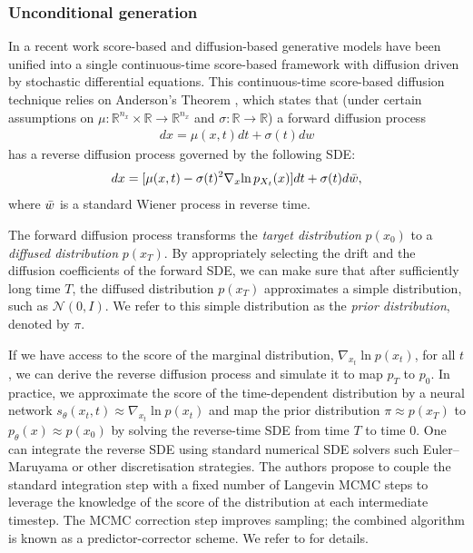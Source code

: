 \subsubsection{Unconditional generation}


In a recent work \cite{song2021sde} score-based  \cite{hyvarinen2005score_original, song2020generative_score} and diffusion-based \cite{sohldickstein2015diffusion_original, ho2020denoising} generative models have been unified into a single continuous-time score-based framework with diffusion driven by stochastic differential equations.  This continuous-time score-based diffusion technique relies on Anderson's Theorem \cite{anderson1982reverse_time_sde}, which states that (under certain assumptions on $\mu : \mathbb{R}^{n_x} \times \mathbb{R} \xrightarrow{} \mathbb{R}^{n_x}$ and $\sigma : \mathbb{R} \xrightarrow{} \mathbb{R}$) a forward diffusion process
\begin{gather}
\label{eq:forward_sde}
 dx = \mu(x,t)dt+\sigma(t)dw   
\end{gather} 
has a reverse diffusion process governed by the following SDE:
\begin{gather}
\label{eq:reverse_sde}
    dx=[\mu(x,t)-\sigma(t)^{2}\nabla_{x}{\ln{p_{X_t}(x)}}]dt + \sigma(t)d\Bar{w},
\end{gather}
where $\Bar{w}$ is a standard Wiener process in reverse time. 

The forward diffusion process transforms the \textit{target distribution} $p(x_0)$ to a \textit{diffused distribution} $p(x_T)$. By appropriately selecting the drift and the diffusion coefficients of the forward SDE, we can make sure that after sufficiently long time $T$, the diffused distribution $p(x_T)$ approximates a simple distribution, such as $\mathcal{N}(0,I)$. We refer to this simple distribution as the \textit{prior distribution}, denoted by $\pi$. 

If we have access to the score of the marginal distribution, $\nabla_{x_t}{\ln{p(x_t)}}$, for all $t$, we can derive the reverse diffusion process and simulate it to map $p_T$ to $p_0$. In practice, we approximate the score of the time-dependent distribution by a neural network $s_{\theta}(x_t,t) \approx \nabla_{x_t}{\ln{p(x_t)}}$ and map the prior distribution $\pi \approx p(x_T)$ to $p_\theta(x) \approx p(x_0)$ by solving the reverse-time SDE from time $T$ to time $0$. One can integrate the reverse SDE using standard numerical SDE solvers such Euler–Maruyama or other discretisation strategies. The authors propose to couple the standard integration step with a fixed number of Langevin MCMC steps to leverage the knowledge of the score of the distribution at each intermediate timestep. The MCMC correction step improves sampling; the combined algorithm is known as a predictor-corrector scheme.  We refer to \cite{song2021sde} for details.

